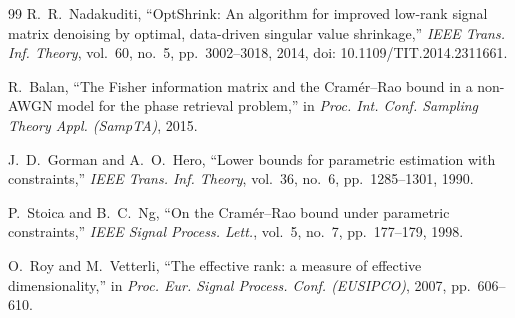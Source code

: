\documentclass[journal]{IEEEtran}
\begin{document}
\begin{thebibliography}{99}
R.~R.~Nadakuditi,
``OptShrink: An algorithm for improved low-rank signal matrix denoising by
optimal, data-driven singular value shrinkage,''
\emph{IEEE Trans. Inf. Theory}, vol.~60, no.~5, pp.~3002--3018, 2014,
doi: 10.1109/TIT.2014.2311661.

R.~Balan,
``The Fisher information matrix and the Cram\'er--Rao bound in a non-AWGN model for the phase retrieval problem,''
in \emph{Proc. Int. Conf. Sampling Theory Appl. (SampTA)},
2015.

J.~D.~Gorman and A.~O.~Hero,
``Lower bounds for parametric estimation with constraints,''
\emph{IEEE Trans. Inf. Theory},
vol.~36, no.~6, pp.~1285--1301, 1990.

P.~Stoica and B.~C.~Ng,
``On the Cram\'er--Rao bound under parametric constraints,''
\emph{IEEE Signal Process. Lett.},
vol.~5, no.~7, pp.~177--179, 1998.

O.~Roy and M.~Vetterli,
``The effective rank: a measure of effective dimensionality,''
in \emph{Proc. Eur. Signal Process. Conf. (EUSIPCO)},
2007, pp.~606--610.

\end{thebibliography}
\end{document}
